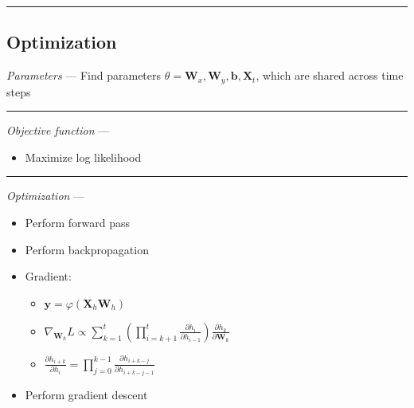 {\color{black}\hrule height 0.001mm}

\subsection*{Optimization}
\emph{Parameters} --- Find parameters $\theta = \boldsymbol{W}_x, \boldsymbol{W}_y, \boldsymbol{b}, \boldsymbol{X}_t$, which are shared across time steps

{\color{lightgray}\hrule height 0.001mm}

\emph{Objective function} --- 
\begin{itemize}
    \item Maximize log likelihood
\end{itemize}

{\color{lightgray}\hrule height 0.001mm}

\emph{Optimization} ---
\begin{itemize}
    \item Perform forward pass
    \item Perform backpropagation
    \item Gradient:
    \begin{itemize}
        \item $\boldsymbol{y} = \varphi( \boldsymbol{X}_h \boldsymbol{W}_h )$
        \item $\nabla_{\boldsymbol{W}_h} L \propto \sum_{k=1}^t ( \prod_{i=k+1}^t \frac{\partial h_i}{\partial h_{i-1}} ) \frac{\partial h_k}{\partial \boldsymbol{W}_k}$
        \item $\frac{\partial h_{i+k}}{\partial h_{i}} = \prod_{j=0}^{k-1} \frac{\partial h_{i+k-j}}{\partial h_{i+k-j-1}}$
    \end{itemize}
    \item Perform gradient descent
\end{itemize}